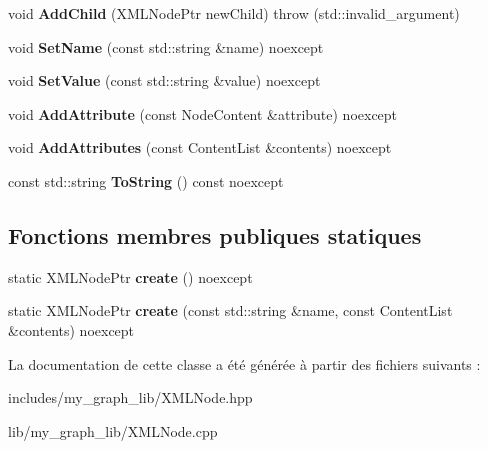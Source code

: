 \begin{DoxyCompactItemize}
\item 
\mbox{\label{classmy_1_1XMLNode_a8972a7ae739ea8c7a175e213d1e557b6}} 
void {\bfseries Add\+Child} (X\+M\+L\+Node\+Ptr new\+Child)  throw (std\+::invalid\+\_\+argument)
\item 
\mbox{\label{classmy_1_1XMLNode_a7d8c7ca736572bdbe6f41168355b7d21}} 
void {\bfseries Set\+Name} (const std\+::string \&name) noexcept
\item 
\mbox{\label{classmy_1_1XMLNode_a691c0a7d8a79a1d77feab41e301302ee}} 
void {\bfseries Set\+Value} (const std\+::string \&value) noexcept
\item 
\mbox{\label{classmy_1_1XMLNode_a7d2476e452605c51c389b71de41d7b89}} 
void {\bfseries Add\+Attribute} (const Node\+Content \&attribute) noexcept
\item 
\mbox{\label{classmy_1_1XMLNode_a96ea71f07c1b7e64a79a2b9b3ae79604}} 
void {\bfseries Add\+Attributes} (const Content\+List \&contents) noexcept
\item 
\mbox{\label{classmy_1_1XMLNode_a4e7c83cdf473df3d1df3988410b1e6b5}} 
const std\+::string {\bfseries To\+String} () const noexcept
\end{DoxyCompactItemize}
\subsection*{Fonctions membres publiques statiques}
\begin{DoxyCompactItemize}
\item 
\mbox{\label{classmy_1_1XMLNode_a19d4fb15b7120b70e6a1ab83314611f6}} 
static X\+M\+L\+Node\+Ptr {\bfseries create} () noexcept
\item 
\mbox{\label{classmy_1_1XMLNode_adf5cf5a818a30464c82d506a6732ea96}} 
static X\+M\+L\+Node\+Ptr {\bfseries create} (const std\+::string \&name, const Content\+List \&contents) noexcept
\end{DoxyCompactItemize}


La documentation de cette classe a été générée à partir des fichiers suivants \+:\begin{DoxyCompactItemize}
\item 
includes/my\+\_\+graph\+\_\+lib/X\+M\+L\+Node.\+hpp\item 
lib/my\+\_\+graph\+\_\+lib/X\+M\+L\+Node.\+cpp\end{DoxyCompactItemize}
